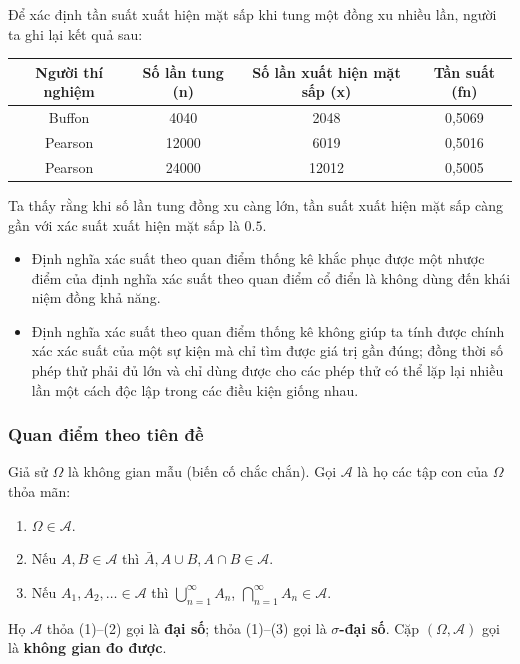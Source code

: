 \documentclass[12pt,a4paper]{article}
\begin{document}
\begin{vidu}[title={Tung đồng xu}]
Để xác định tần suất xuất hiện mặt sấp khi tung một đồng xu nhiều lần, người ta ghi lại kết quả sau:
\begin{center}
\begin{tabular}{|c|c|c|c|}
Người thí nghiệm & Số lần tung (n) & Số lần xuất hiện mặt sấp (x) & Tần suất (fn) \\
\hline
Buffon & 4040 & 2048 & 0,5069 \\
Pearson & 12000 & 6019 & 0,5016 \\
Pearson & 24000 & 12012 & 0,5005 \\
\end{tabular}
\end{center}
Ta thấy rằng khi số lần tung đồng xu càng lớn, tần suất xuất hiện mặt sấp càng gần với xác suất xuất hiện mặt sấp là $0.5$.
\end{vidu}

\begin{luuy}
  \begin{itemize}
    \item Định nghĩa xác suất theo quan điểm thống kê khắc phục được một nhược điểm của định nghĩa xác suất theo quan điểm cổ điển là không dùng đến khái niệm đồng khả năng.
    \item Định nghĩa xác suất theo quan điểm thống kê không giúp ta tính được chính xác xác suất của một sự kiện mà chỉ tìm được giá trị gần đúng; đồng thời số phép thử phải đủ lớn và chỉ dùng được cho các phép thử có thể lặp lại nhiều lần một cách độc lập trong các điều kiện giống nhau.
  \end{itemize}
\end{luuy}

\subsubsection{Quan điểm theo tiên đề}

\begin{dinhnghia}[title={Quan điểm theo tiên đề}]
Giả sử $\Omega$ là không gian mẫu (biến cố chắc chắn). Gọi $\mathcal{A}$ là họ các tập con của $\Omega$ thỏa mãn:
\begin{enumerate}
  \item $\Omega \in \mathcal{A}$.
  \item Nếu $A, B \in \mathcal{A}$ thì $\bar{A}, A \cup B, A \cap B \in \mathcal{A}$.
  \item Nếu $A_1, A_2, \ldots \in \mathcal{A}$ thì $\displaystyle\bigcup_{n=1}^{\infty} A_n$, $\displaystyle\bigcap_{n=1}^{\infty} A_n \in \mathcal{A}$.
\end{enumerate}
Họ $\mathcal{A}$ thỏa (1)--(2) gọi là \textbf{đại số}; thỏa (1)--(3) gọi là \textbf{$\sigma$-đại số}. Cặp $(\Omega, \mathcal{A})$ gọi là \textbf{không gian đo được}.
\end{dinhnghia}
\end{document}
